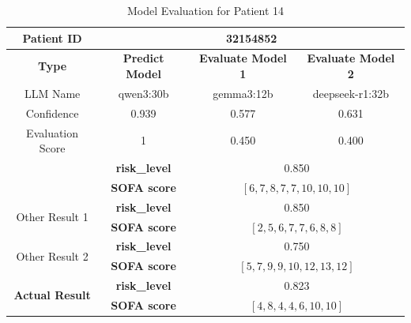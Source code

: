 \begin{table}[htbp]
 \centering
 \caption{Model Evaluation for Patient 14}
 \label{tab:patient14}
 \begin{tabular}{cccc}
 \toprule
 \textbf{ Patient ID } & \multicolumn{3}{c}{32154852} \\
 \midrule
 \textbf{ Type } & \textbf{ Predict Model } & \textbf{ Evaluate Model 1 } & \textbf{ Evaluate Model 2 } \\
 LLM Name & qwen3:30b & gemma3:12b & deepseek-r1:32b \\
 Confidence & 0.939 & 0.577 & 0.631 \\
 Evaluation Score & 1 & 0.450 & 0.400 \\
 \midrule
 \addlinespace
 \multirow{2}{*}{\textbf{ Best Result }} & \textbf{ risk\_level } & \multicolumn{2}{c}{0.850} \\
      & \textbf{ SOFA score } & \multicolumn{2}{c}{$[6, 7, 8, 7, 7, 10, 10, 10]$} \\
 \midrule
 \multirow{2}{*}{Other Result 1} & \textbf{ risk\_level } & \multicolumn{2}{c}{0.850} \\
      & \textbf{ SOFA score } & \multicolumn{2}{c}{$[2, 5, 6, 7, 7, 6, 8, 8]$} \\
 \midrule
 \multirow{2}{*}{Other Result 2} & \textbf{ risk\_level } & \multicolumn{2}{c}{0.750} \\
      & \textbf{ SOFA score } & \multicolumn{2}{c}{$[5, 7, 9, 9, 10, 12, 13, 12]$} \\
 \midrule
 \multirow{2}{*}{\textbf{ Actual Result }} & \textbf{ risk\_level } & \multicolumn{2}{c}{0.823} \\
      & \textbf{ SOFA score } & \multicolumn{2}{c}{$[4, 8, 4, 4, 6, 10, 10]$} \\
 \bottomrule
 \end{tabular}
\end{table}

